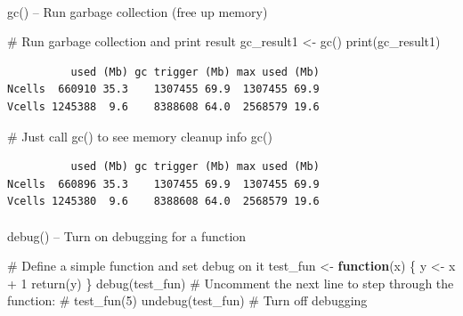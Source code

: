\documentclass[
  letterpaper,
  DIV=11,
  numbers=noendperiod]{scrartcl}
\makeatletter
\let\oldparagraph\paragraph
\renewcommand{\paragraph}{
    \@ifstar
      \xxxParagraphStar
      \xxxParagraphNoStar
  }
\newcommand{\xxxParagraphStar}[1]{\oldparagraph*{#1}\mbox{}}
\newcommand{\xxxParagraphNoStar}[1]{\oldparagraph{#1}\mbox{}}
\newenvironment{Shaded}{\begin{snugshade}}{\end{snugshade}}
\newcommand{\CommentTok}[1]{\textcolor[rgb]{0.37,0.37,0.37}{#1}}
\newcommand{\ControlFlowTok}[1]{\textcolor[rgb]{0.00,0.23,0.31}{\textbf{#1}}}
\newcommand{\DecValTok}[1]{\textcolor[rgb]{0.68,0.00,0.00}{#1}}
\newcommand{\FunctionTok}[1]{\textcolor[rgb]{0.28,0.35,0.67}{#1}}
\newcommand{\NormalTok}[1]{\textcolor[rgb]{0.00,0.23,0.31}{#1}}
\newcommand{\OtherTok}[1]{\textcolor[rgb]{0.00,0.23,0.31}{#1}}
\newcommand{\SpecialCharTok}[1]{\textcolor[rgb]{0.37,0.37,0.37}{#1}}
\makeatother
\begin{document}
\paragraph{gc() -- Run garbage collection (free up
memory)}\label{gc-run-garbage-collection-free-up-memory}

\begin{Shaded}
\begin{Highlighting}[]
\CommentTok{\#   Run garbage collection and print result}
\NormalTok{gc\_result1 }\OtherTok{\textless{}{-}} \FunctionTok{gc}\NormalTok{()}
\FunctionTok{print}\NormalTok{(gc\_result1)}
\end{Highlighting}
\end{Shaded}

\begin{verbatim}
          used (Mb) gc trigger (Mb) max used (Mb)
Ncells  660910 35.3    1307455 69.9  1307455 69.9
Vcells 1245388  9.6    8388608 64.0  2568579 19.6
\end{verbatim}

\begin{Shaded}
\begin{Highlighting}[]
\CommentTok{\#   Just call gc() to see memory cleanup info}
\FunctionTok{gc}\NormalTok{()}
\end{Highlighting}
\end{Shaded}

\begin{verbatim}
          used (Mb) gc trigger (Mb) max used (Mb)
Ncells  660896 35.3    1307455 69.9  1307455 69.9
Vcells 1245380  9.6    8388608 64.0  2568579 19.6
\end{verbatim}

\paragraph{debug() -- Turn on debugging for a
function}\label{debug-turn-on-debugging-for-a-function}

\begin{Shaded}
\begin{Highlighting}[]
\CommentTok{\#   Define a simple function and set debug on it}
\NormalTok{test\_fun }\OtherTok{\textless{}{-}} \ControlFlowTok{function}\NormalTok{(x) \{}
\NormalTok{  y }\OtherTok{\textless{}{-}}\NormalTok{ x }\SpecialCharTok{+} \DecValTok{1}
  \FunctionTok{return}\NormalTok{(y)}
\NormalTok{\}}
\FunctionTok{debug}\NormalTok{(test\_fun)}
\CommentTok{\# Uncomment the next line to step through the function:}
\CommentTok{\# test\_fun(5)}
\FunctionTok{undebug}\NormalTok{(test\_fun)  }\CommentTok{\# Turn off debugging}
\end{Highlighting}
\end{Shaded}
\end{document}
